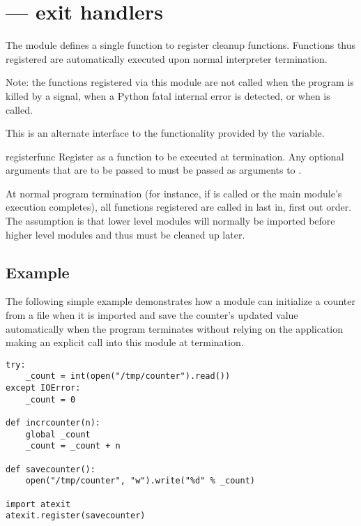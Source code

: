 \section{ ---
         exit handlers}



The  module defines a single function to register
cleanup functions.  Functions thus registered are automatically
executed upon normal interpreter termination.

Note: the functions registered via this module are not called when the program is killed by a
signal, when a Python fatal internal error is detected, or when
 is called.

This is an alternate interface to the functionality provided by the
 variable.

\begin{funcdesc}{register}{func}
Register  as a function to be executed at termination.  Any
optional arguments that are to be passed to  must be passed
as arguments to .

At normal program termination (for instance, if
 is called or the main module's execution
completes), all functions registered are called in last in, first out
order.  The assumption is that lower level modules will normally be
imported before higher level modules and thus must be cleaned up
later.
\end{funcdesc}


\subsection{ Example \label{atexit-example}}

The following simple example demonstrates how a module can initialize
a counter from a file when it is imported and save the counter's
updated value automatically when the program terminates without
relying on the application making an explicit call into this module at
termination.

\begin{verbatim}
try:
    _count = int(open("/tmp/counter").read())
except IOError:
    _count = 0

def incrcounter(n):
    global _count
    _count = _count + n

def savecounter():
    open("/tmp/counter", "w").write("%d" % _count)

import atexit
atexit.register(savecounter)
\end{verbatim}

